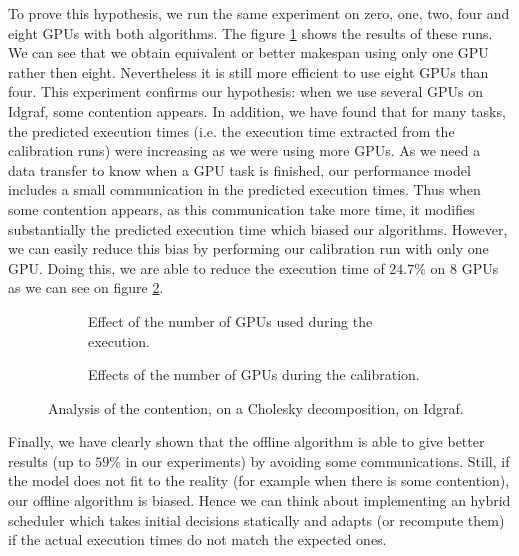 \documentclass[10pt, conference, compsocconf,pdftex,dvipsnames]{IEEEtran}
\begin{document}
To prove this hypothesis, we run the same experiment on zero, one, two, four
and eight GPUs with both algorithms. The figure \ref{fig:ContentionGpu} shows
the results of these runs.  We can see that we obtain equivalent or better
makespan using only one GPU rather then eight.  Nevertheless it is still more
efficient to use eight GPUs than four. This experiment confirms our hypothesis:
when we use several GPUs on Idgraf, some contention appears. In addition, we
have found that for many tasks, the predicted execution times (i.e. the
execution time extracted from the calibration runs) were increasing as we were
using more GPUs. As we need a data transfer to know when a GPU task is
finished, our performance model includes a small communication in the
predicted execution times. Thus when some contention appears, as this
communication take more time, it modifies substantially the predicted execution
time which biased our algorithms.  However, we can easily reduce this bias by
performing our calibration run with only one GPU.  Doing this, we are able to
reduce the execution time of $24.7\%$ on 8 GPUs as we can see on figure
\ref{fig:ContentionTrick}.

\begin{figure}[htb]
    \centering
    \begin{subfigure}{0.5\textwidth}
        \scalebox{0.65}{
            
        }
        \caption{Effect of the number of GPUs used during the execution.}
        \label{fig:ContentionGpu}
    \end{subfigure}
    \begin{subfigure}{0.5\textwidth}
        \scalebox{0.65}{
            
        }
        \caption{Effects of the number of GPUs during the calibration.}
        \label{fig:ContentionTrick}
    \end{subfigure}
    \caption{Analysis of the contention, on a 
    Cholesky decomposition, on Idgraf.}
    \label{fig:Contention}
\end{figure}

Finally, we have clearly shown that the offline algorithm is able to give
better results (up to $59\%$ in our experiments) by avoiding some
communications. Still, if the model does not fit to the reality (for example
when there is some contention), our offline algorithm is biased. Hence we can
think about implementing an hybrid scheduler which takes initial decisions
statically and adapts (or recompute them) if the actual execution times do not
match the expected ones.
\end{document}
